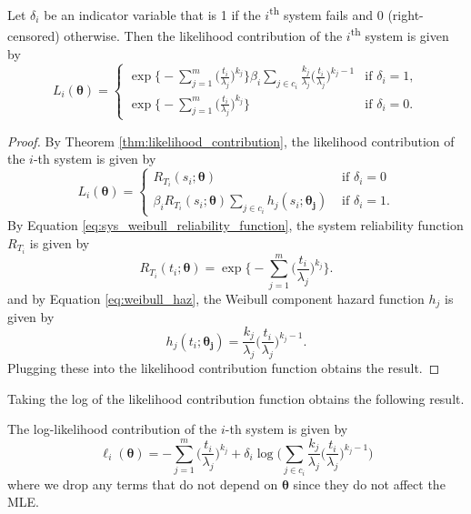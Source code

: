 \documentclass[
]{article}
\begin{document}
\begin{theorem}
Let $\delta_i$ be an indicator variable that is 1 if the
$i$\textsuperscript{th} system fails and 0 (right-censored) otherwise.
Then the likelihood contribution of the $i$\textsuperscript{th} system is given by
\begin{equation}
\label{eq:weibull_likelihood_contribution}
L_i(\boldsymbol{\theta}) =
\begin{cases}
    \exp\biggl\{-\sum_{j=1}^{m}\bigl(\frac{t_i}{\lambda_j}\bigr)^{k_j}\biggr\}
        \beta_i \sum_{j \in c_i} \frac{k_j}{\lambda_j}\bigl(\frac{t_i}{\lambda_j}\bigr)^{k_j-1}
    & \text{if } \delta_i = 1,\\
    \exp\bigl\{-\sum_{j=1}^{m}\bigl(\frac{t_i}{\lambda_j}\bigr)^{k_j}\biggr\} & \text{if } \delta_i = 0.
\end{cases}
\end{equation}
\end{theorem}
\begin{proof}
By Theorem \ref{thm:likelihood_contribution}, the likelihood contribution of the
$i$-th system is given by
$$
L_i(\boldsymbol{\theta}) =
\begin{cases}
    R_{T_i}(s_i;\boldsymbol{\theta})                      &\text{ if } \delta_i = 0\\
    \beta_i R_{T_i}(s_i;\boldsymbol{\theta})
        \sum_{j\in c_i} h_j(s_i;\boldsymbol{\theta_j})   &\text{ if } \delta_i = 1.
\end{cases}
$$
By Equation \eqref{eq:sys_weibull_reliability_function}, the system reliability
function $R_{T_i}$ is given by
$$
R_{T_i}(t_i;\boldsymbol{\theta}) = \exp\biggl\{-\sum_{j=1}^{m}\biggl(\frac{t_i}{\lambda_j}\biggr)^{k_j}\biggr\}.
$$
and by Equation \eqref{eq:weibull_haz}, the Weibull component hazard function $h_j$ is
given by
$$
h_j(t_i;\boldsymbol{\theta_j}) = \frac{k_j}{\lambda_j}\biggl(\frac{t_i}{\lambda_j}\biggr)^{k_j-1}.
$$
Plugging these into the likelihood contribution function obtains the result.
\end{proof}

Taking the log of the likelihood contribution function obtains the
following result.

\begin{corollary}
The log-likelihood contribution of the $i$-th system is given by
\begin{equation}
\label{eq:weibull_log_likelihood_contribution}
\ell_i(\boldsymbol{\theta}) =
-\sum_{j=1}^{m}\biggl(\frac{t_i}{\lambda_j}\biggr)^{k_j} +
    \delta_i \log \!\Biggl(    
        \sum_{j \in c_i} \frac{k_j}{\lambda_j}\biggl(\frac{t_i}{\lambda_j}\biggr)^{k_j-1}
    \Biggr)
\end{equation}
where we drop any terms that do not depend on $\boldsymbol{\theta}$ since they do not
affect the MLE.
\end{corollary}
\end{document}
